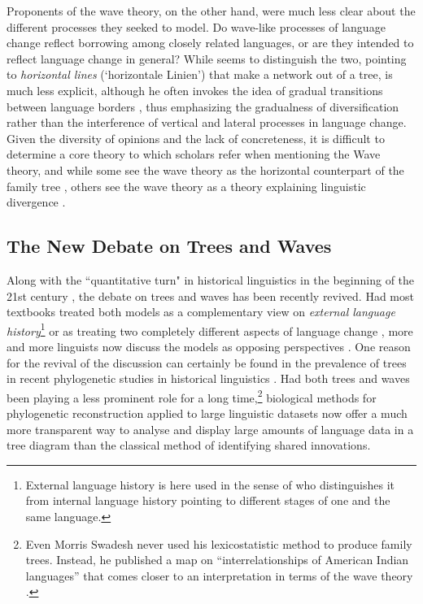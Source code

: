 \documentclass[svgnames,12pt]{scrartcl}
\begin{document}
{Proponents of the
wave theory, on the other hand, were much less clear about the different processes they seeked to
model. Do wave-like processes of language change reflect borrowing among closely related languages,
or are they intended to reflect language change in general? While \citet{Schuchardt1870} seems to distinguish
the two, pointing to \emph{horizontal lines} (`{horizontale Linien}') that make a network out of a
tree, \citet{Schmidt1872} is much less explicit, although he often invokes the idea of gradual
transitions between language borders \citep[200]{Schmidt1875}, thus emphasizing the gradualness of
diversification rather than the interference of vertical and lateral processes in language change.
Given the diversity of opinions and the lack of concreteness, it is
difficult to determine a core theory to which scholars refer when mentioning the Wave theory, and
while some see the wave theory as the horizontal counterpart of the family tree \citep[74]{Baxter2006a},
others see the wave theory as a theory explaining linguistic divergence
\citep[188-191]{Campbell1999}.

\subsection{The New Debate on Trees and Waves}
Along with the ``quantitative turn" in historical linguistics in the beginning of the 21st century \citep[209f]{List2014d}, the debate on
trees and waves has been recently revived. Had most textbooks treated both models as a complementary view on
\emph{external language history}\footnote{External language history is here used in the sense of
\citet{Gabelentz1891} who distinguishes it from internal language history pointing to different
stages of one and the same language.} \citep{Lehmann1992,Anttila1972} or as treating two completely
different aspects of language change \citep{Campbell1999}, more and more linguists now  
discuss the models as opposing perspectives \citep{Heggarty2010,Francois2015}. One reason for the revival of the
discussion can certainly be found in the prevalence of trees in recent phylogenetic studies in historical linguistics
\citep{Gray2003,Atkinson2006,Ringe2002,Pagel2009}. Had both trees and waves been playing a less
prominent role for a long time,\footnote{Even Morris Swadesh never used his lexicostatistic method to
produce family trees. Instead, he published a map on ``interrelationships of American Indian
languages'' that comes closer to an interpretation in terms of the wave theory
\citep[23]{Swadesh1959}.} biological methods for phylogenetic reconstruction applied to large
linguistic datasets now offer a much more transparent way to analyse and display large amounts of language data in a
tree diagram than the classical method of identifying shared innovations.
 
}
\end{document}
